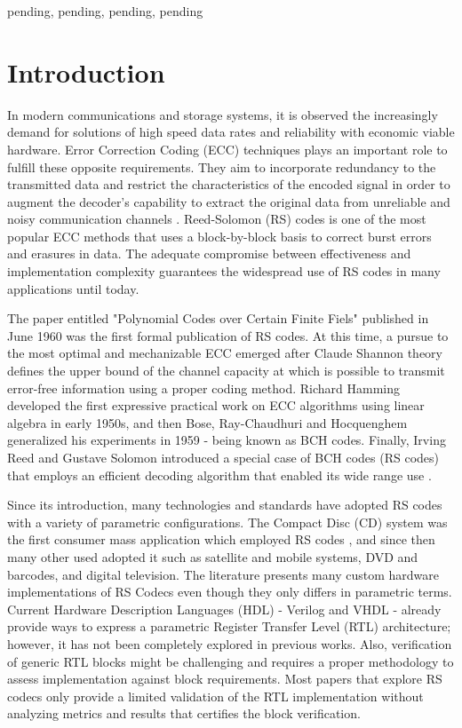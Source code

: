 \documentclass[conference]{IEEEtran}
\begin{document}
\begin{IEEEkeywords}
pending, pending, pending, pending
\end{IEEEkeywords}

\section{Introduction}
\par In modern communications and storage systems, it is observed the increasingly demand for solutions of high speed data rates and reliability with economic viable hardware. Error Correction Coding (ECC) techniques plays an important role to fulfill these opposite requirements. They aim to incorporate redundancy to the transmitted data and restrict the characteristics of the encoded signal in order to augment the decoder's capability to extract the original data from  unreliable and noisy communication channels \cite{b1}. Reed-Solomon (RS) codes is one of the most popular ECC methods that uses a block-by-block basis to correct burst errors and erasures in data. The adequate compromise between effectiveness and implementation complexity guarantees the widespread use of RS codes in many applications until today.

\par The paper entitled "Polynomial Codes over Certain Finite Fiels" \cite{b2} published in June 1960 was the first formal publication of RS codes. At this time, a pursue to the most optimal and mechanizable ECC emerged after Claude Shannon theory defines the upper bound of the channel capacity at which is possible to transmit error-free information using a proper coding method. Richard Hamming developed the first expressive practical work on ECC algorithms using linear algebra in early 1950s, and then Bose, Ray-Chaudhuri and Hocquenghem generalized his experiments in 1959 - being known as BCH codes. Finally, Irving Reed and Gustave Solomon introduced a special case of BCH codes (RS codes) that employs an efficient decoding algorithm that enabled its wide range use \cite{b3}.

\par Since its introduction, many technologies and standards have adopted RS codes with a variety of parametric configurations. The Compact Disc (CD) system was the first consumer mass application which employed RS codes \cite{b4}, and since then many other used adopted it such as satellite and mobile systems, DVD and barcodes, and digital television. The literature presents many custom hardware implementations of RS Codecs even though they only differs in parametric terms. Current Hardware Description Languages (HDL) - Verilog and VHDL - already provide ways to express a parametric Register Transfer Level (RTL) architecture; however, it has not been completely explored in previous works. Also, verification of generic RTL blocks might be challenging and requires a proper methodology to assess implementation against block requirements. Most papers that explore RS codecs only provide a limited validation of the RTL implementation without analyzing metrics and results that certifies the block verification.  
\end{document}
